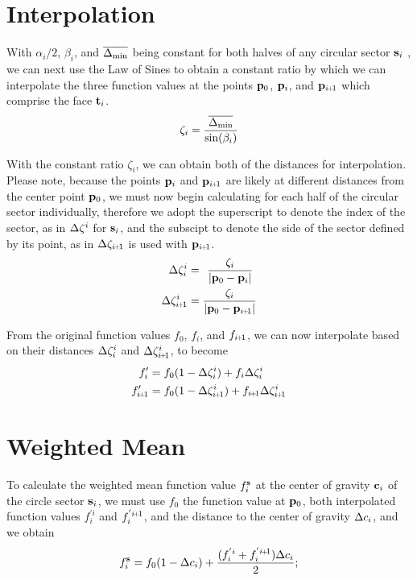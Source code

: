 \section{Interpolation}
\label{cFONSsI}
With $\alpha_i/2$, $\beta_i$, and $\overline{\Delta_\text{min}}$ being constant for both halves of any circular sector $\mathbf{s}_i$ , we can next use the Law of Sines to obtain a constant ratio by which we can interpolate the three function values at the points $\mathbf{p}_0$, $\mathbf{p}_i$, and $\bp_{\sipo}$ which comprise the face $\mathbf{t}_i$.
\begin{equation}
	\zeta_i = \frac{\overline{\Delta_\text{min}}}{\sin(\beta_i)}
	\label{eq:zeta}
\end{equation}%
%

With the constant ratio $\zeta_i$, we can obtain both of the distances for interpolation. Please note, because the points $\mathbf{p}_i$ and $\bp_{\sipo}$ are likely at different distances from the center point $\mathbf{p}_0$, we must now begin calculating for each half of the circular sector individually, therefore we adopt the superscript to denote the index of the sector, as in $\Delta\zeta^i$ for $\mathbf{s}_i$, and the subscipt to denote the side of the sector defined by its point, as in $\Dz_{\sipo}$ is used with $\bp_{\sipo}$.
\begin{align}
	\Dz^i_i & = \kern4pt\frac{\zeta_i}{|\bp_0 - \bp_i|}
	\label{eq:distanceIForInterpolation}\\
	\Dz^i_{\sipo} & = \frac{\zeta_i}{|\bp_0 - \bp_{\sipo}|}
	\label{eq:distanceIp1ForInterpolation}
\end{align}%
%

From the original function values $f_0$, $f_i$, and $f_{\sipo}$, we can now interpolate based on their distances $\Delta\zeta^i_i$ and $\Dz^i_{\sipo}$, to become
\begin{align}
	f'_i & = f_0(1 - \Dz^i_i) + f_i\Dz^i_i \\
	f'_{\sipo} & = f_0(1 - \Dz^i_{\sipo}) + f_{\sipo}\Dz^i_{\sipo}
	\label{eq:interpolatedFs}
\end{align}%
%
%
\section{Weighted Mean}
\label{cFONSsWM}
To calculate the weighted mean function value $f^{\mathbf{s}}_i$ at the center of gravity $\mathbf{c}_i$ of the circle sector $\mathbf{s}_i$, we must use $f_0$ the function value at $\mathbf{p}_0$, both interpolated function values $f^{'i}_i$ and $f^{'\sipo}_i$, and the distance to the center of gravity $\Delta c_i$, and we obtain
\begin{equation}
	f^\bs_i = f_0(1 - \Dc_i) + \frac{(f^{'i}_i + f^{'\sipo}_i)\Dc_i}{2};
	\label{eq:weightedMeanAtCoGatSector}
\end{equation}%
%

